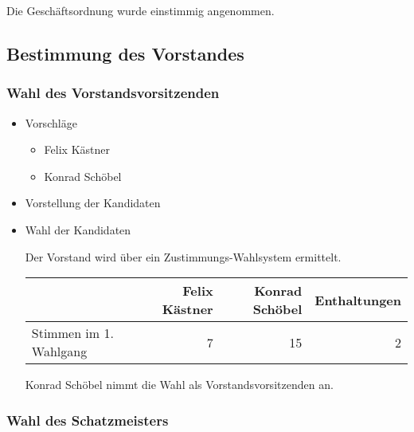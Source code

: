 \documentclass[11pt]{article}
\begin{document}
Die Geschäftsordnung wurde einstimmig angenommen.
\subsection{Bestimmung des Vorstandes}
\label{sec-1.7}

\subsubsection{Wahl des Vorstandsvorsitzenden}
\label{sec-1.7.1}

\begin{itemize}

\item Vorschläge\\
\label{sec-1.7.1.1}

\begin{itemize}
\item Felix Kästner
\item Konrad Schöbel
\end{itemize}

\item Vorstellung der Kandidaten\\
\label{sec-1.7.1.2}


\item Wahl der Kandidaten\\
\label{sec-1.7.1.3}

Der Vorstand wird über ein Zustimmungs-Wahlsystem ermittelt.


\begin{center}
\begin{tabular}{lrrr}
\hline
                         &  Felix Kästner  &  Konrad Schöbel  & Enthaltungen \\
\hline
 Stimmen im 1. Wahlgang  &              7  &              15  &  2\\
\hline
\end{tabular}
\end{center}



Konrad Schöbel nimmt die Wahl als Vorstandsvorsitzenden an.

\end{itemize} %
\subsubsection{Wahl des Schatzmeisters}
\label{sec-1.7.2}
\end{document}
